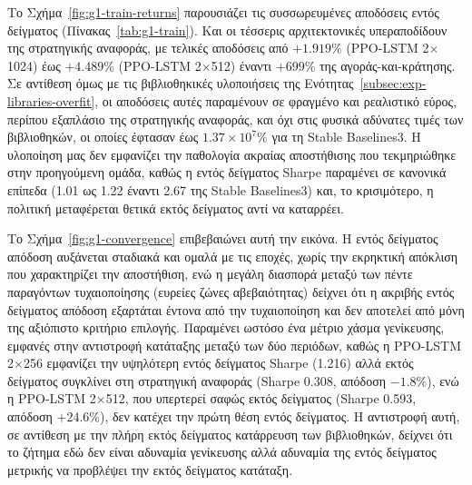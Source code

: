 Το Σχήμα~\ref{fig:g1-train-returns} παρουσιάζει τις συσσωρευμένες αποδόσεις εντός δείγματος
(Πίνακας~\ref{tab:g1-train}). Και οι τέσσερις αρχιτεκτονικές υπεραποδίδουν της στρατηγικής αναφοράς,
με τελικές αποδόσεις από $+1.919\%$ (PPO-LSTM 2$\times$1024) έως $+4.489\%$ (PPO-LSTM 2$\times$512)
έναντι $+699\%$ της αγοράς-και-κράτησης. Σε αντίθεση όμως με τις βιβλιοθηκικές υλοποιήσεις της
Ενότητας~\ref{subsec:exp-libraries-overfit}, οι αποδόσεις αυτές παραμένουν σε φραγμένο και ρεαλιστικό
εύρος, περίπου εξαπλάσιο της στρατηγικής αναφοράς, και όχι στις φυσικά αδύνατες τιμές των βιβλιοθηκών,
οι οποίες έφτασαν έως $1{.}37\times10^{7}\%$ για τη Stable Baselines3. Η υλοποίηση μας δεν
εμφανίζει την παθολογία ακραίας αποστήθισης που τεκμηριώθηκε στην προηγούμενη ομάδα, καθώς η εντός δείγματος
Sharpe παραμένει σε κανονικά επίπεδα (1.01 ως 1.22 έναντι 2.67 της Stable Baselines3) και, το κρισιμότερο,
η πολιτική μεταφέρεται θετικά εκτός δείγματος αντί να καταρρέει.

Το Σχήμα~\ref{fig:g1-convergence} επιβεβαιώνει αυτή την εικόνα. Η εντός δείγματος απόδοση αυξάνεται
σταδιακά και ομαλά με τις εποχές, χωρίς την εκρηκτική απόκλιση που χαρακτηρίζει την αποστήθιση, ενώ η
μεγάλη διασπορά μεταξύ των πέντε παραγόντων τυχαιοποίησης (ευρείες ζώνες αβεβαιότητας) δείχνει ότι η
ακριβής εντός δείγματος απόδοση εξαρτάται έντονα από την τυχαιοποίηση και δεν αποτελεί από μόνη της
αξιόπιστο κριτήριο επιλογής. Παραμένει ωστόσο ένα μέτριο χάσμα γενίκευσης, εμφανές στην αντιστροφή
κατάταξης μεταξύ των δύο περιόδων, καθώς η PPO-LSTM 2$\times$256 εμφανίζει την υψηλότερη εντός δείγματος
Sharpe (1.216) αλλά εκτός δείγματος συγκλίνει στη στρατηγική αναφοράς (Sharpe 0.308, απόδοση $-1{.}8\%$),
ενώ η PPO-LSTM 2$\times$512, που υπερτερεί σαφώς εκτός δείγματος (Sharpe 0.593, απόδοση $+24{.}6\%$),
δεν κατέχει την πρώτη θέση εντός δείγματος. Η αντιστροφή αυτή, σε αντίθεση με την πλήρη εκτός δείγματος
κατάρρευση των βιβλιοθηκών, δείχνει ότι το ζήτημα εδώ δεν είναι αδυναμία γενίκευσης αλλά αδυναμία της
εντός δείγματος μετρικής να προβλέψει την εκτός δείγματος κατάταξη.

